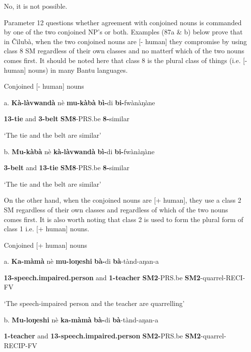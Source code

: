 \documentclass[output=paper]{langscibook}
\begin{document}
No, it is not possible.

Parameter 12 questions whether agreement with conjoined nouns is commanded by one of the two conjoined NP’s or both. Examples (87a \& b) below prove that in Čilubà, when the two conjoined nouns are [- human] they compromise by using class 8 SM regardless of their own classes and no matterf which of the two nouns comes first. It should be noted here that class 8 is the plural class of things (i.e. [-human] nouns) in many Bantu languages.

\ea%
    \label{ex:lukusa:87}
    \z

          Conjoined [- human] nouns

a.   \textbf{Kà-làvwandà}   nè   \textbf{mu-kàbà}  \textbf{bì-}di        \textbf{bi-}fwànàŋàne

\textbf{13-tie}       and   \textbf{3-belt}    \textbf{SM8}{}-PRS.be  \textbf{8-}similar

\glt ‘The tie and the belt are similar’

b.  \textbf{Mu-kàbà}   nè   \textbf{kà-làvwandà}    \textbf{bì-}di        \textbf{bi-}fwànàŋàne

\textbf{3-belt}     and   \textbf{13-tie}        \textbf{SM8}{}-PRS.be  \textbf{8-}similar

\glt ‘The tie and the belt are similar’

On the other hand, when the conjoined nouns are [+ human], they use a class 2 SM regardless of their own classes and regardless of which of the two nouns comes first. It is also worth noting that class 2 is used to form the plural form of class 1 i.e. [+ human] nouns.

\ea%
    \label{ex:lukusa:88}
    \z

          Conjoined [+ human] nouns

a.   \textbf{Ka-màmà}               nè   \textbf{mu-loŋeshi}    \textbf{bà\--}di        \textbf{bà}{}-tànd-aŋan-a

\textbf{13-speech.impaired.person}   and   \textbf{1-teacher}    \textbf{SM2}{}-\-PRS.be  \textbf{SM2}{}-quarrel-RECI-FV

\glt ‘The speech-impaired person and the teacher are quarrelling’

b.   \textbf{Mu-loŋeshi}   nè   \textbf{ka-màmà}              \textbf{bà\--}di        \textbf{bà}{}-tànd-aŋan-a

\textbf{1-teacher}     and   \textbf{13-speech.impaired.person}  \textbf{SM2-}PRS.be  \textbf{SM2}{}-quarrel-RECIP-FV
\end{document}
